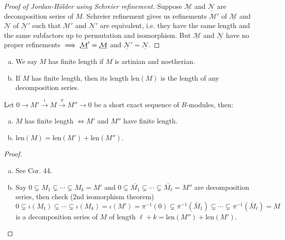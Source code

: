 \documentclass[a4paper]{report}
\begin{document}
\begin{proof}[Proof of Jordan-Hölder using Schreier refinement]
  Suppose $\underline{\mathcal M}$ and $\underline{\mathcal N}$ are decomposition series of $M$. Schreier refinement gives us refinements $\underline{\mathcal M}'$ of $\underline{\mathcal M}$ and $\underline{\mathcal N}$ of $\underline{\mathcal N}'$ such that $\underline{\mathcal M}'$ and $\underline{\mathcal N}'$ are equivalent, i.e. they have the same length and the same subfactors up to permutation and isomorphism. But $\underline{\mathcal M}$ and $\underline{\mathcal N}$ have no proper refinements $\implies \underline{\mathcal M}' = \underline{\mathcal M}$ and $\underline{\mathcal N}' = \underline{\mathcal N}$. \qedhere
\end{proof}
\begin{defi}
\begin{enumerate}[(a)]
  \item We say $M$ has finite length if $M$ is artinian and noetherian.
        \item If $M$ has finite length, then its length $\mathrm{len}(M)$ is the length of any decomposition series.
\end{enumerate}
\end{defi}

\begin{prop}
  Let $0 \to M' \xrightarrow \iota M \xrightarrow \pi M'' \to 0$ be a short exact sequence of $R$-modules, then:
  \begin{enumerate}[(a)]
    \item $M$ has finite length $\iff M'$ and $M''$ have finite length.
          \item $\mathrm{len}(M) = \mathrm{len}(M') + \mathrm{len}(M'')$.
  \end{enumerate}
\begin{proof}
\begin{enumerate}[(a)]
  \item See Cor. 44.
  \item Say $0 \subsetneq M_{1} \subsetneq \cdots \subsetneq M_{k} = M'$ and $0 \subsetneq \bar{M_{1}} \subsetneq \cdots \subsetneq \bar{M_{\ell}} = M''$ are decomposition series, then check (2nd isomorphism theorem) \[0 \subsetneq \iota(M_{1}) \subsetneq \cdots \subsetneq \iota(M_{k}) = \iota(M') = \pi^{-1}(0) \subsetneq \pi^{-1}(\bar M_{1}) \subsetneq \cdots \subsetneq\pi^{-1}(\bar M_{\ell}) = M\]
        is a decomposition series of $M$ of length $\ell + k = \mathrm{len}(M'') + \mathrm{len}(M')$. \qedhere
\end{enumerate}
\end{proof}
\end{prop}
\end{document}
